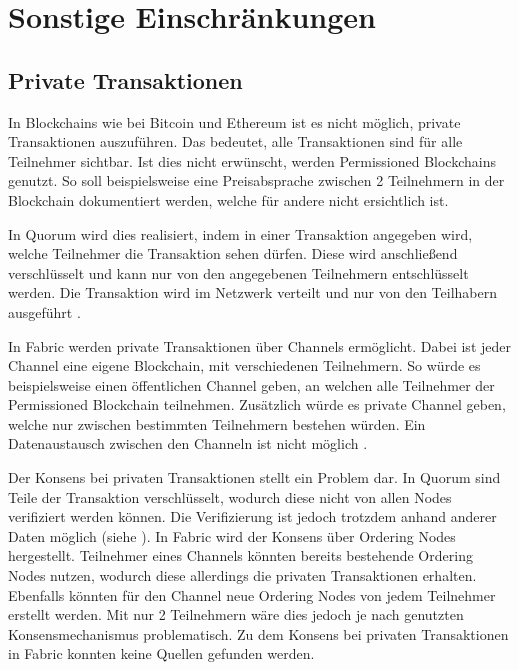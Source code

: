 \section{Sonstige Einschränkungen}

\subsection{Private Transaktionen}
In Blockchains wie bei Bitcoin und Ethereum ist es nicht möglich, private Transaktionen auszuführen. Das bedeutet, alle Transaktionen sind für alle Teilnehmer sichtbar. Ist dies nicht erwünscht, werden Permissioned Blockchains genutzt. So soll beispielsweise eine Preisabsprache zwischen 2 Teilnehmern in der Blockchain dokumentiert werden, welche für andere nicht ersichtlich ist.

In Quorum wird dies realisiert, indem in einer Transaktion angegeben wird, welche Teilnehmer die Transaktion sehen dürfen. Diese wird anschließend verschlüsselt und kann nur von den angegebenen Teilnehmern entschlüsselt werden. Die Transaktion wird im Netzwerk verteilt und nur von den Teilhabern ausgeführt \cite{QuorumTeamTransactionProcessingQuorum2018}.

In Fabric werden private Transaktionen über Channels ermöglicht. Dabei ist jeder Channel eine eigene Blockchain, mit verschiedenen Teilnehmern. So würde es beispielsweise einen öffentlichen Channel geben, an welchen alle Teilnehmer der Permissioned Blockchain teilnehmen. Zusätzlich würde es private Channel geben, welche nur zwischen bestimmten Teilnehmern bestehen würden. Ein Datenaustausch zwischen den Channeln ist nicht möglich \cite{SchererPerformanceScalabilityBlockchain2017}. 

Der Konsens bei privaten Transaktionen stellt ein Problem dar. In Quorum sind Teile der Transaktion verschlüsselt, wodurch diese nicht von allen Nodes verifiziert werden können. Die Verifizierung ist jedoch trotzdem anhand anderer Daten möglich (siehe \cite{QuorumTeamQuorumChainConsensus2018}). In Fabric wird der Konsens über Ordering Nodes hergestellt. Teilnehmer eines Channels könnten bereits bestehende Ordering Nodes nutzen, wodurch diese allerdings die privaten Transaktionen erhalten. Ebenfalls könnten für den Channel neue Ordering Nodes von jedem Teilnehmer erstellt werden. Mit nur 2 Teilnehmern wäre dies jedoch je nach genutzten Konsensmechanismus problematisch. Zu dem Konsens bei privaten Transaktionen in Fabric konnten keine Quellen gefunden werden.

